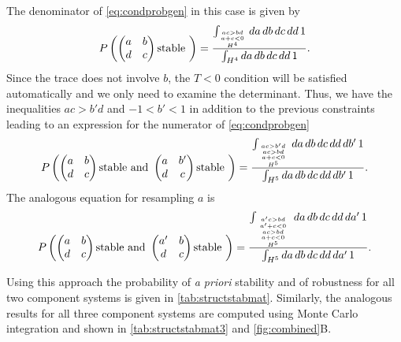 The denominator of \ref{eq:condprobgen} in this case is given by
\begin{align*}
P\left(\begin{pmatrix}
a & b \\
d & c
\end{pmatrix} \textrm{stable } \right) = \frac{\int_{\genfrac{}{}{0pt}{}{\genfrac{}{}{0pt}{}{ac>bd}{a+c<0}}{H^4}} da\,db\,dc\,dd\,1}{\int_{H^4} da\,db\,dc\,dd\,1}.
\end{align*}
Since the trace does not involve $b$, the $T<0$ condition will be satisfied automatically and we only need to examine the determinant. Thus, we have the inequalities $ac > b'd$ and $-1 < b' < 1$ in addition to the previous constraints leading to an expression for the numerator of \ref{eq:condprobgen}
\begin{align*}
P\left(\begin{pmatrix}
a & b \\
d & c
\end{pmatrix} \textrm{stable and } \begin{pmatrix}
a & b' \\
d & c
\end{pmatrix} \textrm{stable } \right) = \frac{\int_{{{ac>b'd \atop ac>bd} \atop a+c<0} \atop H^5} da\,db\,dc\,dd\,db'\,1}{\int_{H^5} da\,db\,dc\,dd\,db'\,1}.
\end{align*}
The analogous equation for resampling $a$ is
\begin{align*}
P\left(\begin{pmatrix}
a & b \\
d & c
\end{pmatrix} \textrm{stable and } \begin{pmatrix}
a' & b \\
d & c
\end{pmatrix} \textrm{stable } \right) = \frac{\int_{{{{a'c>bd \atop a' + c < 0} \atop ac>bd} \atop a+c<0} \atop H^5} da\,db\,dc\,dd\,da'\,1}{\int_{H^5} da\,db\,dc\,dd\,da'\,1}.
\end{align*}

Using this approach the probability of \emph{a priori} stability and of robustness for all two component systems is given in \ref{tab:structstabmat}. Similarly, the analogous results for all three component systems are computed using Monte Carlo integration and shown in \ref{tab:structstabmat3} and \ref{fig:combined}B.


